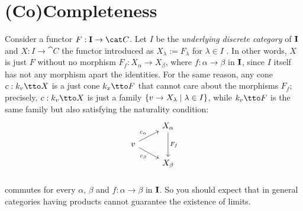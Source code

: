 
\section{(Co)Completeness}

  Consider a functor \(F : {\bf I} \to \cat C\). Let \(I\) be the {\em underlying discrete category} of \({\bf I}\)  and \(X : I \to \cat C\) the functor introduced as \(X_\lambda := F_\lambda\) for \(\lambda \in I\) . In other words, \(X\) is just \(F\) without no morphism \(F_f : X_\alpha \to X_\beta\), where \(f : \alpha \to \beta\) in \({\bf I}\), since \(I\) itself has not any morphism apart the identities. For the same reason, any cone \(c : k_v \tto X\) is a just cone \(k_x \tto F\) that cannot care about the morphisms \(F_f\); precisely, \(c : k_v \tto X\) is just a family \(\left\{v \to X_\lambda \mid \lambda \in I\right\}\), while \(k_v \tto F\) is the same family but also satisfying the naturality condition:
\[\begin{tikzcd}[row sep=small]
& X_\alpha \ar["{F_f}", dd] \\
v \ar["{c_\alpha}", ur] \ar["{c_\beta}", dr, swap] \\
& X_\beta \\
\end{tikzcd}\] 
commutes for every \(\alpha\), \(\beta\) and \(f : \alpha \to \beta\) in \({\bf I}\). So you should expect that in general categories having products cannot guarantee the existence of limits.


